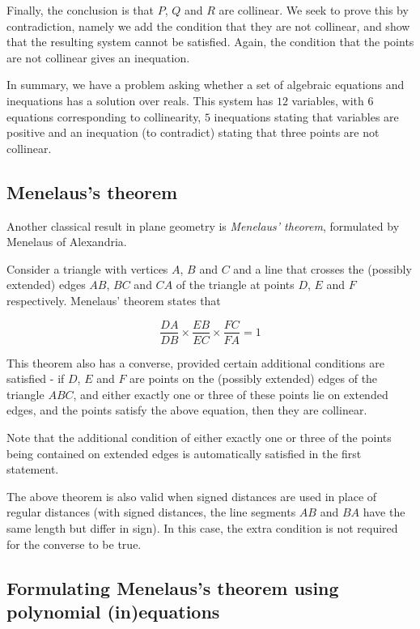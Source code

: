 \documentclass{amsart}
\theoremstyle{plain}
\theoremstyle{definition}
\theoremstyle{remark}
\begin{document}
Finally, the conclusion is that \(P\), \(Q\) and \(R\) are collinear. We
seek to prove this by contradiction, namely we add the condition that
they are not collinear, and show that the resulting system cannot be
satisfied. Again, the condition that the points are not collinear gives
an inequation.

In summary, we have a problem asking whether a set of algebraic
equations and inequations has a solution over reals. This system has
\(12\) variables, with \(6\) equations corresponding to collinearity,
\(5\) inequations stating that variables are positive and an inequation
(to contradict) stating that three points are not collinear.

\subsection{Menelaus's theorem}

Another classical result in plane geometry is \emph{Menelaus' theorem}, formulated by Menelaus of Alexandria.

Consider a triangle with vertices \(A\), \(B\) and \(C\) and a line that crosses the (possibly extended) edges \(AB\), \(BC\) and \(CA\) of the triangle at points \(D\), \(E\) and \(F\) respectively. Menelaus' theorem states that

$$
\frac{DA}{DB} \times \frac{EB}{EC} \times \frac{FC}{FA} = 1
$$

This theorem also has a converse, provided certain additional conditions are satisfied - if \(D\), \(E\) and \(F\) are points on the (possibly extended) edges of the triangle \(ABC\), and either exactly one or three of these points lie on extended edges, and the points satisfy the above equation, then they are collinear.

Note that the additional condition of either exactly one or three of the points being contained on extended edges is automatically satisfied in the first statement.

The above theorem is also valid when signed distances are used in place of regular distances (with signed distances, the line segments \(AB\) and \(BA\) have the same length but differ in sign). In this case, the extra condition is not required for the converse to be true.

\subsection{Formulating Menelaus's theorem using polynomial (in)equations}
\end{document}
